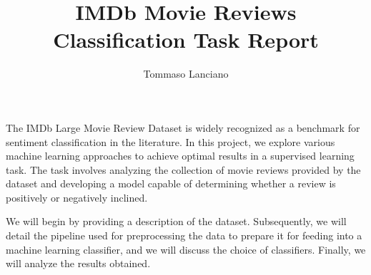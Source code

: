 \documentclass[12pt]{article}
\title{IMDb Movie Reviews Classification Task Report}
\author{Tommaso Lanciano}
\date{}
\begin{document}
\maketitle


The IMDb Large Movie Review Dataset \cite{maas2011data} is widely recognized as a benchmark for sentiment classification in the literature. In this project, we explore various machine learning approaches to achieve optimal results in a supervised learning task. The task involves analyzing the collection of movie reviews provided by the dataset and developing a model capable of determining whether a review is positively or negatively inclined.

We will begin by providing a description of the dataset. Subsequently, we will detail the pipeline used for preprocessing the data to prepare it for feeding into a machine learning classifier, and we will discuss the choice of classifiers. Finally, we will analyze the results obtained.












\end{document}
